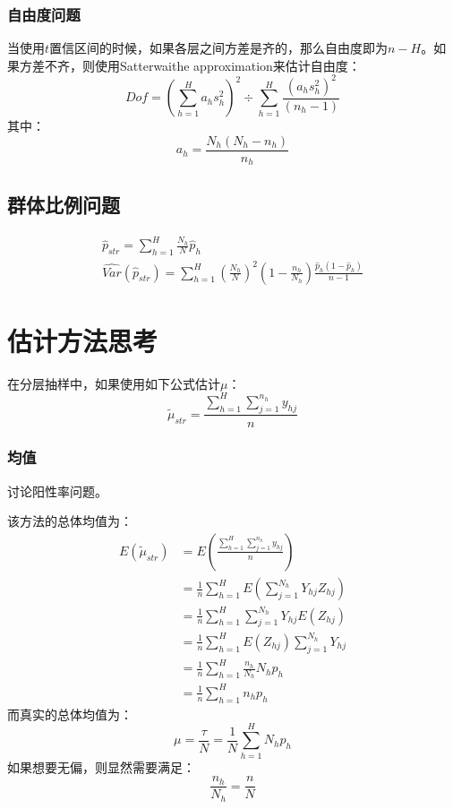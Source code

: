 \subsubsection{自由度问题}
当使用$t$置信区间的时候，如果各层之间方差是齐的，那么自由度即为$n-H$。如果方差不齐，则使用Satterwaithe approximation来估计自由度：
\begin{equation*}
	Dof=\left(\sum_{h=1}^Ha_hs_h^2\right)^2\div\sum_{h=1}^H\frac{(a_hs_h^2)^2}{(n_h-1)}
\end{equation*}
其中：
\begin{equation*}
	a_h=\frac{N_h(N_h-n_h)}{n_h}
\end{equation*}

\subsection{群体比例问题}
\begin{gather*}
	\hat{p}_{str}=\sum_{h=1}^H\frac{N_h}{N}\hat{p}_h \\
	\widehat{Var}(\hat{p}_{str})=\sum_{h=1}^H\left(\frac{N_h}{N}\right)^2\left(1-\frac{n_h}{N_h}\right)\frac{\hat{p}_h(1-\hat{p}_h)}{n-1}
\end{gather*}

\section{估计方法思考}
在分层抽样中，如果使用如下公式估计$\mu$：
\begin{equation*}
	\tilde{\mu}_{str}=\frac{\sum\limits_{h=1}^H\sum\limits_{j=1}^{n_h}y_{hj}}{n}
\end{equation*}
\subsubsection{均值}
讨论阳性率问题。\par
该方法的总体均值为：
\begin{align*}
	E(\tilde{\mu}_{str})
	&=E\left(\frac{\sum\limits_{h=1}^H\sum\limits_{j=1}^{n_h}y_{hj}}{n}\right) \\
	&=\frac{1}{n}\sum_{h=1}^HE\left(\sum_{j=1}^{N_h}Y_{hj}Z_{hj}\right) \\
	&=\frac{1}{n}\sum_{h=1}^H\sum_{j=1}^{N_h}Y_{hj}E(Z_{hj}) \\
	&=\frac{1}{n}\sum_{h=1}^HE(Z_{hj})\sum_{j=1}^{N_h}Y_{hj} \\
	&=\frac{1}{n}\sum_{h=1}^H\frac{n_h}{N_h}N_hp_h \\
	&=\frac{1}{n}\sum_{h=1}^Hn_hp_h
\end{align*}
而真实的总体均值为：
\begin{equation*}
	\mu=\frac{\tau}{N}=\frac{1}{N}\sum_{h=1}^HN_hp_h
\end{equation*}
如果想要无偏，则显然需要满足：
\begin{equation*}
	\frac{n_h}{N_h}=\frac{n}{N}
\end{equation*}

